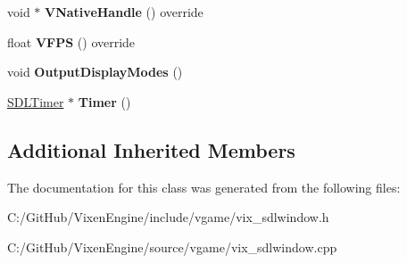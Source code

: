 \begin{DoxyCompactItemize}
\item 
\hypertarget{class_vixen_1_1_s_d_l_game_window_a41d5b7d0ff1f9995056258f19cd71838}{}void $\ast$ {\bfseries V\+Native\+Handle} () override\label{class_vixen_1_1_s_d_l_game_window_a41d5b7d0ff1f9995056258f19cd71838}

\item 
\hypertarget{class_vixen_1_1_s_d_l_game_window_ad5589cabdb1f9283efb584aae30bc270}{}float {\bfseries V\+F\+P\+S} () override\label{class_vixen_1_1_s_d_l_game_window_ad5589cabdb1f9283efb584aae30bc270}

\item 
\hypertarget{class_vixen_1_1_s_d_l_game_window_ada62a0bc2aa763494598a7a922a58abf}{}void {\bfseries Output\+Display\+Modes} ()\label{class_vixen_1_1_s_d_l_game_window_ada62a0bc2aa763494598a7a922a58abf}

\item 
\hypertarget{class_vixen_1_1_s_d_l_game_window_af57196ddafcc3f67a85383bfe6330924}{}\hyperlink{class_vixen_1_1_s_d_l_timer}{S\+D\+L\+Timer} $\ast$ {\bfseries Timer} ()\label{class_vixen_1_1_s_d_l_game_window_af57196ddafcc3f67a85383bfe6330924}

\end{DoxyCompactItemize}
\subsection*{Additional Inherited Members}


The documentation for this class was generated from the following files\+:\begin{DoxyCompactItemize}
\item 
C\+:/\+Git\+Hub/\+Vixen\+Engine/include/vgame/vix\+\_\+sdlwindow.\+h\item 
C\+:/\+Git\+Hub/\+Vixen\+Engine/source/vgame/vix\+\_\+sdlwindow.\+cpp\end{DoxyCompactItemize}
